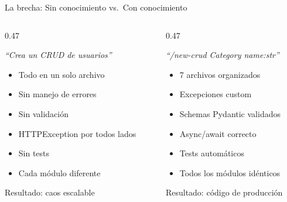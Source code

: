 \documentclass[aspectratio=169,11pt]{beamer}
\begin{document}
\begin{frame}{La brecha: Sin conocimiento vs.\ Con conocimiento}
  \begin{columns}[T]
    \begin{column}{0.47\textwidth}
      \begin{tcolorbox}[colback=ixtiLightGray!10, colframe=ixtiLightGray, title={\faUser\ Principiante + Copilot}, fonttitle=\small\bfseries, coltitle=ixtiDark, top=3pt, bottom=3pt]
        \small
        \textit{``Crea un CRUD de usuarios''}
        \vspace{0.2em}
        \begin{itemize}\setlength{\itemsep}{0pt}
          \item[\textcolor{ixtiLightGray}{\faAngleRight}] Todo en un solo archivo
          \item[\textcolor{ixtiLightGray}{\faAngleRight}] Sin manejo de errores
          \item[\textcolor{ixtiLightGray}{\faAngleRight}] Sin validaci\'on
          \item[\textcolor{ixtiLightGray}{\faAngleRight}] HTTPException por todos lados
          \item[\textcolor{ixtiLightGray}{\faAngleRight}] Sin tests
          \item[\textcolor{ixtiLightGray}{\faAngleRight}] Cada m\'odulo diferente
        \end{itemize}
        \centering\textcolor{ixtiLightGray}{\small Resultado: caos escalable}
      \end{tcolorbox}
    \end{column}
    \begin{column}{0.47\textwidth}
      \begin{tcolorbox}[colback=ixtiGreen!5, colframe=ixtiTeal, title={\faUserGraduate\ Dev + Copilot configurado}, fonttitle=\small\bfseries, coltitle=white, top=3pt, bottom=3pt]
        \small
        \textit{``/new-crud Category name:str''}
        \vspace{0.2em}
        \begin{itemize}\setlength{\itemsep}{0pt}
          \item[\textcolor{ixtiGreen}{\faAngleRight}] 7 archivos organizados
          \item[\textcolor{ixtiGreen}{\faAngleRight}] Excepciones custom
          \item[\textcolor{ixtiGreen}{\faAngleRight}] Schemas Pydantic validados
          \item[\textcolor{ixtiGreen}{\faAngleRight}] Async/await correcto
          \item[\textcolor{ixtiGreen}{\faAngleRight}] Tests autom\'aticos
          \item[\textcolor{ixtiGreen}{\faAngleRight}] Todos los m\'odulos id\'enticos
        \end{itemize}
        \centering\textcolor{ixtiTeal}{\small Resultado: c\'odigo de producci\'on}
      \end{tcolorbox}
    \end{column}
  \end{columns}


\end{frame}
\end{document}
